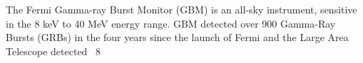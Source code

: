 


\bigskip



\bigskip

\noindent The Fermi Gamma-ray Burst Monitor (GBM) is an all-sky instrument, sensitive in the 8 keV to 40 MeV energy range. GBM  detected over 900 Gamma-Ray Bursts (GRBs) in the four years since the launch of Fermi and the Large Area Telescope detected ~8%

